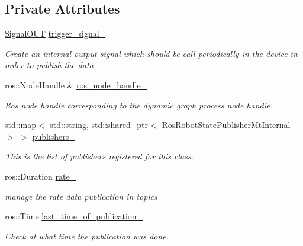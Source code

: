 \subsection*{Private Attributes}
\begin{DoxyCompactItemize}
\item 
\hyperlink{namespacedynamic__graph_a9d80c350c95e161319d7a6e629ecdc4b}{Signal\+O\+UT} \hyperlink{classdynamic__graph_1_1RosRobotStatePublisherMt_af44e1e178bd62374b9b77a630d66ae71}{trigger\+\_\+signal\+\_\+}
\begin{DoxyCompactList}\small\item\em Create an internal output signal which should be call periodically in the device in order to publish the data. \end{DoxyCompactList}\item 
\mbox{\label{classdynamic__graph_1_1RosRobotStatePublisherMt_ad317cb381f8a903622833a384fb9e416}} 
ros\+::\+Node\+Handle \& \hyperlink{classdynamic__graph_1_1RosRobotStatePublisherMt_ad317cb381f8a903622833a384fb9e416}{ros\+\_\+node\+\_\+handle\+\_\+}
\begin{DoxyCompactList}\small\item\em Ros node handle corresponding to the dynamic graph process node handle. \end{DoxyCompactList}\item 
std\+::map$<$ std\+::string, std\+::shared\+\_\+ptr$<$ \hyperlink{structdynamic__graph_1_1RosRobotStatePublisherMtInternal}{Ros\+Robot\+State\+Publisher\+Mt\+Internal} $>$ $>$ \hyperlink{classdynamic__graph_1_1RosRobotStatePublisherMt_a0ff7fbacd021e14f3abcae8dbd5c4ec0}{publishers\+\_\+}
\begin{DoxyCompactList}\small\item\em This is the list of publishers registered for this class. \end{DoxyCompactList}\item 
\mbox{\label{classdynamic__graph_1_1RosRobotStatePublisherMt_a5e7825cca5321d2d535e04a78a789834}} 
ros\+::\+Duration \hyperlink{classdynamic__graph_1_1RosRobotStatePublisherMt_a5e7825cca5321d2d535e04a78a789834}{rate\+\_\+}
\begin{DoxyCompactList}\small\item\em manage the rate data publication in topics \end{DoxyCompactList}\item 
\mbox{\label{classdynamic__graph_1_1RosRobotStatePublisherMt_a3fc518e75944ca45b886b0db99d342c8}} 
ros\+::\+Time \hyperlink{classdynamic__graph_1_1RosRobotStatePublisherMt_a3fc518e75944ca45b886b0db99d342c8}{last\+\_\+time\+\_\+of\+\_\+publication\+\_\+}
\begin{DoxyCompactList}\small\item\em Check at what time the publication was done. \end{DoxyCompactList}\end{DoxyCompactItemize}
